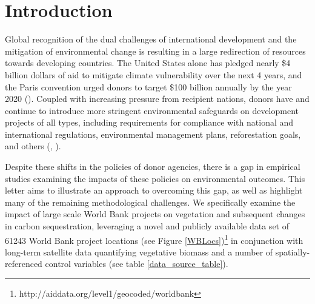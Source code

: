 \documentclass{article}\usepackage[]{graphicx}\usepackage[]{color}
\newenvironment{knitrout}{}{}  %
\begin{document}
\begin{knitrout}



\section{Introduction}

Global recognition of the dual challenges of international development and the mitigation of environmental change is resulting in a large redirection of resources towards developing countries. 
The United States alone has pledged nearly \$4 billion dollars of aid to mitigate climate vulnerability over the next 4 years, and the Paris convention urged donors to target \$100 billion annually by the year 2020 (\cite{royal_united_2015}). 
Coupled with increasing pressure from recipient nations, donors have and continue to introduce more stringent environmental safeguards on development projects of all types, including requirements for compliance with national and international regulations, environmental management plans, reforestation goals, and others (\cite{nielson_delegation_2003}, \cite{gutner_explaining_2005}).



\par

Despite these shifts in the policies of donor agencies, there is a gap in empirical studies examining the impacts of these policies on environmental outcomes.  
This letter aims to illustrate an approach to overcoming this gap, as well as highlight many of the remaining methodological challenges.
We specifically examine the impact of large scale World Bank projects on vegetation and subsequent changes in carbon sequestration, leveraging a novel and publicly available data set of 61243 World Bank project locations (see Figure \ref{WBLocs})\footnote{http://aiddata.org/level1/geocoded/worldbank} in conjunction with long-term satellite data quantifying vegetative biomass and a number of spatially-referenced control variables (see table \ref{data_source_table}).

\begin{table}


\end{table}
\end{knitrout}
\end{document}
